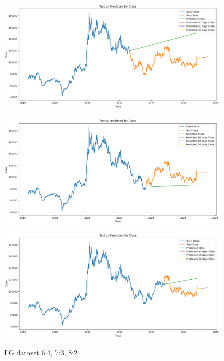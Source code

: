 \documentclass[conference]{IEEEtran}
\begin{document}
\begin{figure}[H]
    \centering
    \begin{minipage}{0.15\textwidth}
    \centering
    \includegraphics[width=1\textwidth]{Image/VARMA/LG/6_4.png}
   
    \label{fig:1}
    \end{minipage}%
    \begin{minipage}{0.15\textwidth}
    \centering
    \includegraphics[width=1\textwidth]{Image/VARMA/LG/7_3.png}
  
    \label{fig:2}
    \end{minipage}%
    \begin{minipage}{0.15\textwidth}
    \centering
    \includegraphics[width=1\textwidth]{Image/VARMA/LG/8_2.png}

    \label{fig:3}
    \end{minipage}
    \caption{ LG dataset 6:4, 7:3, 8:2 }
\end{figure}
\end{document}
